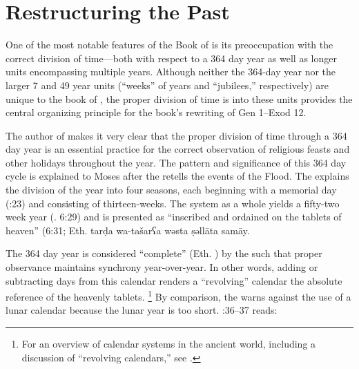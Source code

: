 
\section{Restructuring the Past}

One of the most notable features of the Book of \jub is its preoccupation with the correct division of time---both with respect to a 364 day year as well as longer units encompassing multiple years. Although neither the 364-day year nor the larger 7 and 49 year units (``weeks'' of years and ``jubilees,'' respectively) are unique to the book of \jub, the proper division of time is into these units provides the central organizing principle for the book's rewriting of Gen 1--Exod 12.

The author of \jub makes it very clear that the proper division of time through a 364 day year is an essential practice for the correct observation of religious feasts and other holidays throughout the year. The pattern and significance of this 364 day cycle is explained to Moses after the \ap retells the events of the Flood. The \ap explains the division of the year into four seasons, each beginning with a memorial day (:23) and consisting of thirteen-weeks. The system as a whole yields a fifty-two week year (\jub. 6:29) and is presented as ``inscribed and ordained on the tablets of heaven'' (6:31; Eth.
        {tarḍa wa-tašarʕa wəsta ṣəllāta samāy}.

The 364 day year is considered ``complete'' (Eth. ) by the \ap such that proper observance maintains synchrony year-over-year. In other words, adding or subtracting days from this calendar renders a ``revolving'' calendar \visavis the absolute reference of the heavenly tablets.%
    \footnote{For an overview of calendar systems in the ancient world, including a discussion of ``revolving calendars,'' see \cite[214]{glessmer_flint-vanderkam1999}.}
By comparison, the \ap warns against the use of a lunar calendar because the lunar year is too short. :36--37 reads:

